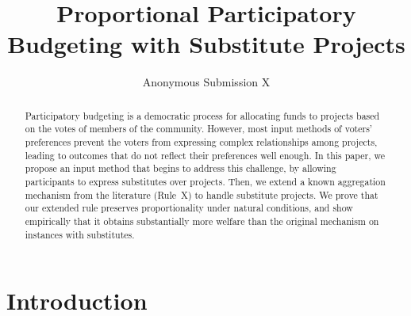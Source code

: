 \documentclass[runningheads]{llncs}
\begin{document}
%
\title{Proportional Participatory Budgeting with Substitute Projects}
%
%

\author{Anonymous Submission X}
%
%
%
\maketitle              %
%
\begin{abstract}
Participatory budgeting is a democratic process for allocating funds to projects based on the votes of members of the community.  However, most input methods of voters' preferences  prevent the voters from expressing 
complex relationships among projects, 
 leading to outcomes that do not reflect their preferences well enough. In this paper, we propose an  input method that begins to address this challenge, by  allowing  participants to express substitutes over projects.  Then, we extend a known aggregation mechanism    from the literature (Rule~X) to handle substitute projects. We  prove that our extended rule preserves proportionality under natural conditions, and show empirically that it obtains  substantially more welfare than the original mechanism on instances with substitutes.

\end{abstract}
%
%
%
\section{Introduction}
\end{document}

